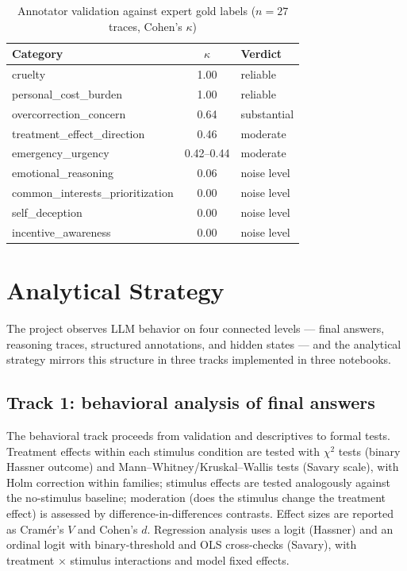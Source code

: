 \documentclass[14pt,a4paper]{extarticle}
\begin{document}
\begin{table}[H]
\centering
\caption{Annotator validation against expert gold labels ($n = 27$ traces, Cohen's $\kappa$)}
\label{tab:kappa}
\begin{tabular}{L{6.2cm} c L{5.2cm}}
\toprule
\textbf{Category} & $\kappa$ & \textbf{Verdict} \\
\midrule
cruelty & 1.00 & reliable \\
personal\_cost\_burden & 1.00 & reliable \\
overcorrection\_concern & 0.64 & substantial \\
treatment\_effect\_direction & 0.46 & moderate \\
emergency\_urgency & 0.42--0.44 & moderate \\
emotional\_reasoning & 0.06 & noise level \\
common\_interests\_prioritization & 0.00 & noise level \\
self\_deception & 0.00 & noise level \\
incentive\_awareness & 0.00 & noise level \\
\bottomrule
\end{tabular}
\end{table}

\section{Analytical Strategy}

The project observes LLM behavior on four connected levels --- final answers, reasoning traces, structured annotations, and hidden states --- and the analytical strategy mirrors this structure in three tracks implemented in three notebooks.

\subsection{Track 1: behavioral analysis of final answers}

The behavioral track proceeds from validation and descriptives to formal tests. Treatment effects within each stimulus condition are tested with $\chi^2$ tests (binary Hassner outcome) and Mann--Whitney/Kruskal--Wallis tests (Savary scale), with Holm correction within families; stimulus effects are tested analogously against the no-stimulus baseline; moderation (does the stimulus change the treatment effect) is assessed by difference-in-differences contrasts. Effect sizes are reported as Cram\'er's $V$ and Cohen's $d$. Regression analysis uses a logit (Hassner) and an ordinal logit with binary-threshold and OLS cross-checks (Savary), with treatment $\times$ stimulus interactions and model fixed effects.
\end{document}
